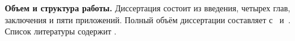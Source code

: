 
\textbf{Объем и структура работы.} Диссертация состоит из введения, четырех глав, заключения и пяти приложений. Полный объём диссертации составляет  
с~
и~. Список литературы содержит  
.
\clearpage

